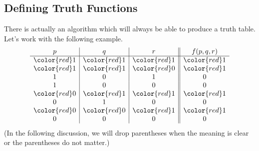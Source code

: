 \documentclass[../notes.tex]{subfiles}
\begin{document}
\subsection{Defining Truth Functions}
There is actually an algorithm which will always be able to produce a truth table. Let's work with the following example.
\[\begin{array}{c|c|c||c}
	p & q & r & f(p,q,r) \\
	\hline
	\color{red}1 & \color{red}1 & \color{red}1 & \color{red}1 \\
	\color{red}1 & \color{red}1 & \color{red}0 & \color{red}1 \\
	1 & 0 & 1 & 0 \\
	1 & 0 & 0 & 0 \\
	\color{red}0 & \color{red}1 & \color{red}1 & \color{red}1 \\
	0 & 1 & 0 & 0 \\
	\color{red}0 & \color{red}0 & \color{red}1 & \color{red}1 \\
	0 & 0 & 0 & 0
\end{array}\]
(In the following discussion, we will drop parentheses when the meaning is clear or the parentheses do not matter.)
\end{document}
